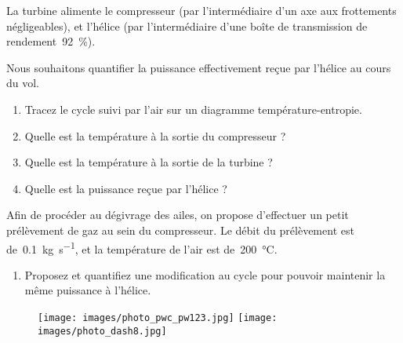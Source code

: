 	 La turbine alimente le compresseur (par l’intermédiaire d’un axe aux frottements négligeables), et l’hélice (par l’intermédiaire d’une boîte de transmission de rendement~\SI{92}{\percent}).
	
	Nous souhaitons quantifier la puissance effectivement reçue par l’hélice au cours du vol.
	
	\begin{enumerate}
		\item Tracez le cycle suivi par l’air sur un diagramme température-entropie.
		\item Quelle est la température à la sortie du compresseur ?
		\item Quelle est la température à la sortie de la turbine ?
		\item Quelle est la puissance reçue par l’hélice ?
	\end{enumerate}

	Afin de procéder au dégivrage des ailes, on propose d’effectuer un petit prélèvement de gaz au sein du compresseur. Le débit du prélèvement est de~\SI{0,1}{\kilogram\per\second}, et la température de l’air est de~\SI{200}{\degreeCelsius}.
	
	\begin{enumerate}
		\item Proposez et quantifiez une modification au cycle pour pouvoir maintenir la même puissance à l’hélice.
	\end{enumerate}
	
	\begin{figure}
		\begin{center}
			\texttt{[image: images/photo\_pwc\_pw123.jpg]}
			\texttt{[image: images/photo\_dash8.jpg]}
		\end{center}
		\label{fig_turboprop_photos}
	\end{figure}
		

